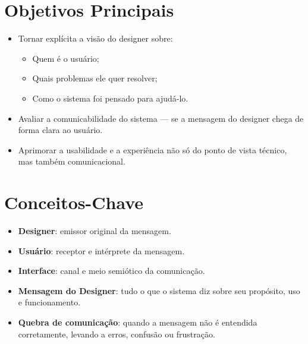 \documentclass[12pt,a4paper]{article}
\begin{document}
\section{Objetivos Principais}
\begin{itemize}
    \item Tornar explícita a visão do designer sobre:
    \begin{itemize}
        \item Quem é o usuário;
        \item Quais problemas ele quer resolver;
        \item Como o sistema foi pensado para ajudá-lo.
    \end{itemize}
    \item Avaliar a comunicabilidade do sistema — se a mensagem do designer chega de forma clara ao usuário.
    \item Aprimorar a usabilidade e a experiência não só do ponto de vista técnico, mas também comunicacional.
\end{itemize}

\section{Conceitos-Chave}
\begin{itemize}
    \item \textbf{Designer}: emissor original da mensagem.
    \item \textbf{Usuário}: receptor e intérprete da mensagem.
    \item \textbf{Interface}: canal e meio semiótico da comunicação.
    \item \textbf{Mensagem do Designer}: tudo o que o sistema diz sobre seu propósito, uso e funcionamento.
    \item \textbf{Quebra de comunicação}: quando a mensagem não é entendida corretamente, levando a erros, confusão ou frustração.
\end{itemize}
\end{document}
